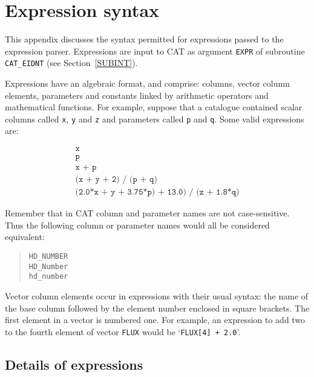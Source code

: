 \documentclass[11pt,twoside]{starlink}
\begin{document}
\begin{small}
\end{small}

\newpage
\section{\label{EXPR}Expression syntax}

This appendix discusses the syntax permitted for expressions passed
to the expression parser. Expressions are input to CAT as argument \texttt{EXPR} of subroutine \texttt{CAT\_EIDNT} (see Section~\ref{SUBINT}).

Expressions have an algebraic format, and comprise: columns, vector
column elements, parameters and constants linked by arithmetic
operators and mathematical functions. For example, suppose that a
catalogue contained scalar columns called \texttt{x}, \texttt{y} and \texttt{z}
and parameters called \texttt{p} and \texttt{q}.  Some valid expressions are:

\begin{equation}
\begin{array}{l}
\texttt{x}  \\
\texttt{p}  \\
\texttt{x + p}  \\
\texttt{(x + y + 2) / (p + q)}  \\
\texttt{(2.0*x + y + 3.75*p) + 13.0) / (z + 1.8*q)}
\end{array}
\end{equation}

Remember that in CAT column and parameter names are not case-sensitive.
Thus the following column or parameter names would all be considered
equivalent:

\begin{verse}
\texttt{HD\_NUMBER} \\
\texttt{HD\_Number} \\
\texttt{hd\_number}
\end{verse}

Vector column elements occur in expressions with their usual syntax:
the name of the base column followed by the element number enclosed
in square brackets. The first element in a vector is numbered one. For
example, an expression to add two to the fourth element of vector
\texttt{FLUX} would be `\texttt{FLUX[4] + 2.0}'.


\subsection{Details of expressions}
\end{document}
